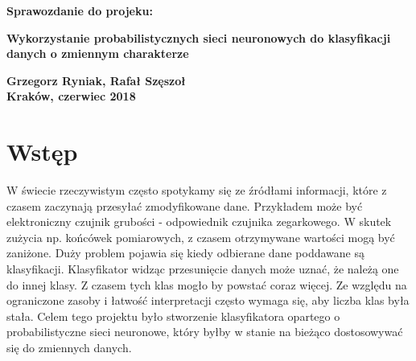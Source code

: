 \documentclass[10pt,a4paper]{article}
\author{Ryniak}
\begin{document}

\thispagestyle{empty}
\vspace*{50ex}
\begin{center}
{\bf\LARGE\textsf{Sprawozdanie do projeku:}}\\
\vspace{5ex}

{\bf\huge\textsf{Wykorzystanie probabilistycznych sieci neuronowych do klasyfikacji danych o zmiennym charakterze}}\\
\vspace{54ex}

{\bf\Large\textsf{Grzegorz Ryniak, Rafał Szęszoł}}\\
\vspace{22ex}
\textsf{\bf\large\textsf{Kraków, czerwiec 2018}}
\end{center}


\newpage

\section{Wstęp}
W świecie rzeczywistym często spotykamy się ze źródłami informacji, które z czasem zaczynają przesyłać zmodyfikowane dane. Przykładem może być elektroniczny czujnik grubości - odpowiednik czujnika zegarkowego. W skutek zużycia np. końcówek pomiarowych, z czasem otrzymywane wartości mogą być zaniżone. Duży problem pojawia się kiedy odbierane dane poddawane są klasyfikacji. Klasyfikator widząc przesunięcie danych może uznać, że należą one do innej klasy. Z czasem tych klas mogło by powstać coraz więcej. Ze względu na ograniczone zasoby i łatwość interpretacji często wymaga się, aby liczba klas była stała. Celem tego projektu było stworzenie klasyfikatora opartego o probabilistyczne sieci neuronowe, który byłby w stanie na bieżąco dostosowywać się do zmiennych danych. 
\end{document}
